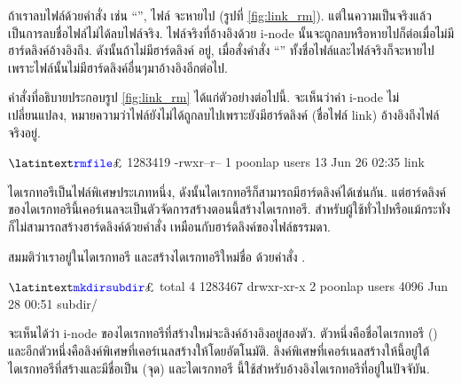 \begin{thwbr}
ถ้าเราลบไฟล์ด้วยคำสั่ง  เช่น ``'', ไฟล์  จะหายไป (รูปที่ \ref{fig:link_rm}). แต่ในความเป็นจริงแล้ว  เป็นการลบชื่อไฟล์ไม่ได้ลบไฟล์จริง. ไฟล์จริงที่อ้างอิงด้วย i-node นั้นจะถูกลบหรือหายไปก็ต่อเมื่อไม่มีฮาร์ดลิงค์อ้างอิงถึง. ดังนั้นถ้าไม่มีฮาร์ดลิงค์  อยู่, เมื่อสั่งคำสั่ง ``'' ทั้งชื่อไฟล์และไฟล์จริงก็จะหายไปเพราะไฟล์นั้นไม่มีฮาร์ดลิงค์อื่นๆมาอ้างอิงอีกต่อไป.

\begin{figure}[!htb]
\end{figure}

คำสั่งที่อธิบายประกอบรูป \ref{fig:link_rm} ได้แก่ตัวอย่างต่อไปนี้. จะเห็นว่าค่า i-node ไม่เปลี่ยนแปลง, หมายความว่าไฟล์ยังไม่ได้ถูกลบไปเพราะยังมีฮาร์ดลิงค์ (ชื่อไฟล์ link) อ้างอิงถึงไฟล์จริงอยู่.
\begin{MyExample}
\begin{MyEx}
$ \cin{rm file}
$ 
1283419 -rwxr--r--    1 poonlap  users          13 Jun 26 02:35 link
                      \arrowup {}
\end{MyEx}
\end{MyExample}

ไดเรกทอรีเป็นไฟล์พิเศษประเภทหนึ่ง, ดังนั้นไดเรกทอรีก็สามารถมีฮาร์ดลิงค์ได้เช่นกัน. แต่ฮาร์ดลิงค์ของไดเรกทอรีนี้เคอร์เนลจะเป็นตัวจัดการสร้างตอนนี้สร้างไดเรกทอรี. สำหรับผู้ใช้ทั่วไปหรือแม้กระทั่งก็ไม่สามารถสร้างฮาร์ดลิงค์ด้วยคำสั่ง  เหมือนกับฮาร์ดลิงค์ของไฟล์ธรรมดา. 

สมมติว่าเราอยู่ในไดเรกทอรี  และสร้างไดเรกทอรีใหม่ชื่อ  ด้วยคำสั่ง . 
\begin{MyExample}[สร้างไดเรกทอรี]
\begin{MyEx}
$ \cin{mkdir subdir}
$ 
total 4
1283467 drwxr-xr-x    2 poonlap  users        4096 Jun 28 00:51 subdir/
\end{MyEx}
\end{MyExample}
จะเห็นได้ว่า i-node ของไดเรกทอรีที่สร้างใหม่จะลิงค์อ้างอิงอยู่สองตัว. ตัวหนึ่งคือชื่อไดเรกทอรี () และอีกตัวหนึ่งคือลิงค์พิเศษที่เคอร์เนลสร้างให้โดยอัตโนมัติ. ลิงค์พิเศษที่เคอร์เนลสร้างให้นี้อยู่ใต้ไดเรกทอรีที่สร้างและมีชื่อเป็น  (จุด) และไดเรกทอรี  นี้ใช้สำหรับอ้างอิงไดเรกทอรีที่อยู่ในปัจจับัน. 


\end{thwbr}
